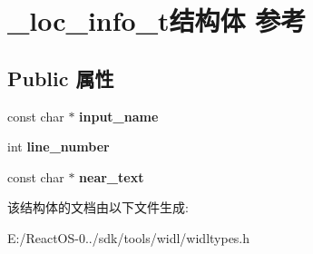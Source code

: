 \hypertarget{struct__loc__info__t}{}\section{\+\_\+loc\+\_\+info\+\_\+t结构体 参考}
\label{struct__loc__info__t}
\subsection*{Public 属性}
\begin{DoxyCompactItemize}
\item 
\mbox{\label{struct__loc__info__t_abbb7f775301341a3bf40368ba2fc18e7}} 
const char $\ast$ {\bfseries input\+\_\+name}
\item 
\mbox{\label{struct__loc__info__t_a3384015aa05cb11b182cca0400219588}} 
int {\bfseries line\+\_\+number}
\item 
\mbox{\label{struct__loc__info__t_a4734ac36cb11ac151c9f5aae8fb400c4}} 
const char $\ast$ {\bfseries near\+\_\+text}
\end{DoxyCompactItemize}


该结构体的文档由以下文件生成\+:\begin{DoxyCompactItemize}
\item 
E\+:/\+React\+O\+S-\/0../sdk/tools/widl/widltypes.\+h\end{DoxyCompactItemize}
